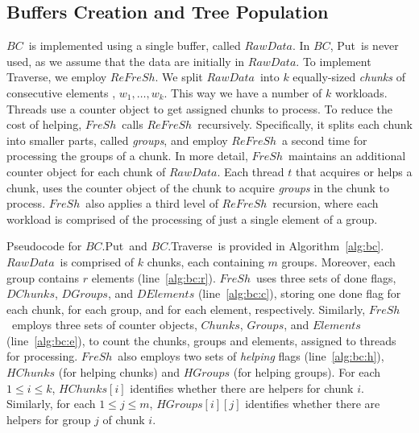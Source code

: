 \documentclass[a4paper,11pt,twoside,openany]{book}
\newcommand{\Put}{\mbox{\sc Put}}
\newcommand{\Traverse}{\mbox{\sc Traverse}}
\newcommand{\BC}{\mbox{$\mathit{BC}$}}
\newcommand{\RawData}{\mbox{$\mathit{RawData}$}}
\newcommand{\Refresh}{\mbox{$\mathit{ReFreSh}$}}
\newcommand{\Fresh}{\mbox{$\mathit{FreSh}$}}
\begin{document}
\subsection{Buffers Creation and Tree Population} 
\label{sec:buffers_and_tree}

\BC\ is implemented using a single buffer, called \RawData.
In \BC, \Put\ is never used, as we assume that the data are initially in \RawData.
% 
To implement \Traverse, we employ \Refresh.  
We split \RawData\ into $k$ equally-sized {\em chunks} of consecutive 
elements , $w_1, \ldots, w_k$. This way we have a number of 
$k$ workloads. 
Threads use a counter object to get assigned chunks to process.
To reduce the cost of helping, \Fresh\ calls \Refresh\ recursively.
Specifically, it splits each chunk into smaller parts,
called {\em groups}, and employ \Refresh\ a second time for processing the groups of a chunk.
% 
In more detail, \Fresh\ maintains an additional counter object 
for each chunk of $RawData$. 
Each thread $t$ that acquires or helps a chunk, uses the counter object of the chunk to acquire
{\em groups} in the chunk to process. \Fresh\ also applies a third level of \Refresh\ recursion,
where each workload is comprised of the processing of just a single element of a group. 

Pseudocode for \BC.\Put\ and \BC.\Traverse\ is provided 
in Algorithm~\ref{alg:bc}. \RawData\ is comprised of $k$ chunks,
each containing $m$ groups. Moreover, each group contains $r$ elements (line~\ref{alg:bc:r}). 
\Fresh\ uses three sets of done flags, $\mathit{DChunks}$, $\mathit{DGroups}$,
and $\mathit{DElements}$ (line~\ref{alg:bc:c}), storing one done flag for each chunk,
for each group, and for each element, respectively.
% 
Similarly, \Fresh\ employs three sets of counter objects, $\mathit{Chunks}$, $\mathit{Groups}$,
and $\mathit{Elements}$ (line~\ref{alg:bc:e}), to count the chunks, groups and elements, assigned
to threads for processing. 
%
\Fresh\ also employs two sets of {\em helping} flags (line~\ref{alg:bc:h}), 
$\mathit{HChunks}$  (for helping chunks) and $\mathit{HGroups}$ (for helping groups). 
For each $1 \leq i \leq k$, $\mathit{HChunks[i]}$ identifies whether there are helpers for chunk $i$.
Similarly, for each $1 \leq j \leq m$, $\mathit{HGroups[i][j]}$ identifies whether there are helpers
for group $j$ of chunk $i$. 
\end{document}

